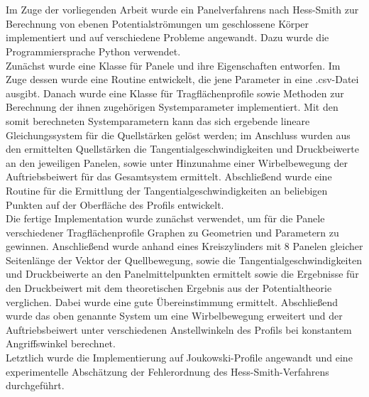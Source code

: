 \chapter*{\abstractname} %
Im Zuge der vorliegenden Arbeit wurde ein Panelverfahrens nach Hess-Smith zur Berechnung von ebenen Potentialströmungen um geschlossene Körper implementiert und auf verschiedene Probleme angewandt. Dazu wurde die Programmiersprache Python verwendet.
\\
Zunächst wurde eine Klasse für Panele und ihre Eigenschaften entworfen. Im Zuge dessen wurde eine Routine entwickelt, die jene Parameter in eine .csv-Datei ausgibt. Danach wurde eine Klasse für Tragflächenprofile sowie Methoden zur Berechnung der ihnen zugehörigen Systemparameter implementiert. Mit den somit berechneten Systemparametern kann das sich ergebende lineare Gleichungssystem für die Quellstärken gelöst werden; im Anschluss wurden aus den ermittelten Quellstärken die Tangentialgeschwindigkeiten und Druckbeiwerte an den jeweiligen Panelen, sowie unter Hinzunahme einer Wirbelbewegung der Auftriebsbeiwert für das Gesamtsystem ermittelt. Abschließend wurde eine Routine für die Ermittlung der Tangentialgeschwindigkeiten an beliebigen Punkten auf der Oberfläche des Profils entwickelt.
\\
Die fertige Implementation wurde zunächst verwendet, um für die Panele verschiedener Tragflächenprofile Graphen zu Geometrien und Parametern zu gewinnen. Anschließend wurde anhand eines Kreiszylinders mit 8 Panelen gleicher Seitenlänge der Vektor der Quellbewegung, sowie die Tangentialgeschwindigkeiten und Druckbeiwerte an den Panelmittelpunkten ermittelt sowie die Ergebnisse für den Druckbeiwert mit dem theoretischen Ergebnis aus der Potentialtheorie verglichen. Dabei wurde eine gute Übereinstimmung ermittelt. Abschließend wurde das oben genannte System um eine Wirbelbewegung erweitert und der Auftriebsbeiwert unter verschiedenen Anstellwinkeln des Profils bei konstantem Angriffswinkel berechnet. 
\\
Letztlich wurde die Implementierung auf Joukowski-Profile angewandt und eine experimentelle Abschätzung der Fehlerordnung des Hess-Smith-Verfahrens durchgeführt.

\newpage
